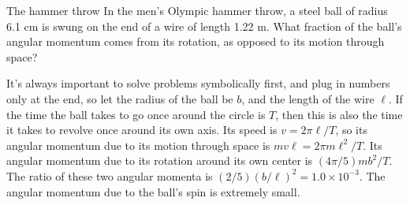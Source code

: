 \begin{eg}{The hammer throw}
\egquestion In the men's Olympic hammer throw, a steel ball of radius 6.1 cm is swung on the
end of a wire of length 1.22 m. What fraction of the ball's angular momentum
comes from its rotation, as opposed to its motion through space?

\eganswer It's always important to solve problems symbolically first, and plug in numbers
only at the end, so let the radius of the ball be $b$, and the length of the wire $\ell$.
If the time the ball takes to go once around the circle is $T$, then
this is also the time it takes to revolve once around its own axis. Its speed
is $v=2\pi\ell/T$, so its angular momentum due to its motion through space
is $mv\ell=2\pi m\ell^2/T$. Its angular momentum due to its rotation around its
own center is $(4\pi/5)mb^2/T$. The ratio of these two angular momenta is
$(2/5)(b/\ell)^2=1.0\times10^{-3}$. The angular momentum due to the ball's
spin is extremely small.
\end{eg}

